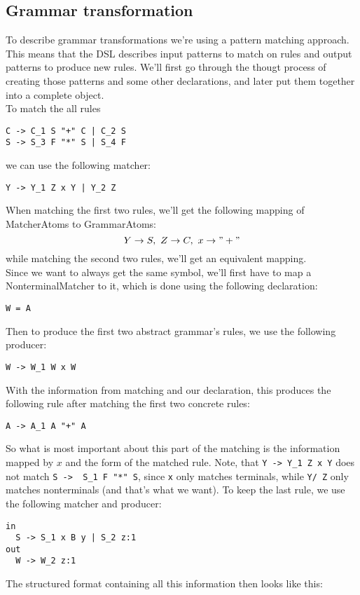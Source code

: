 \documentclass[a4paper]{article}
\begin{document}
\subsection*{Grammar transformation}
To describe grammar transformations we're using a pattern matching approach. This means that the DSL describes input patterns to match on rules and output patterns to produce new rules. We'll first go through the thougt process of creating those patterns and some other declarations, and later put them together into a complete object.\\
To match the all rules 
\begin{lstlisting}[language=grammar]
C -> C_1 S "+" C | C_2 S
S -> S_3 F "*" S | S_4 F
\end{lstlisting}
we can use the following matcher:
\lstset{language=transformer}
\begin{lstlisting}
Y -> Y_1 Z x Y | Y_2 Z
\end{lstlisting}
When matching the first two rules, we'll get the following mapping of MatcherAtoms to GrammarAtoms:
$$Y\to S, ~Z\to C, ~x\to "+"$$
while matching the second two rules, we'll get an equivalent mapping.\\
Since we want to always get the same symbol, we'll first have to map a NonterminalMatcher to it, which is done using the following declaration:
\begin{lstlisting}
W = A
\end{lstlisting}
Then to produce the first two abstract grammar's rules, we use the following producer:
\begin{lstlisting}
W -> W_1 W x W
\end{lstlisting}
With the information from matching and our declaration, this produces the following rule after matching the first two concrete rules:
\begin{lstlisting}[language=grammar]
A -> A_1 A "+" A
\end{lstlisting}
So what is most important about this part of the matching is the information mapped by $x$ and the form of the matched rule. Note, that \lstinline{Y -> Y_1 Z x Y} does not match \lstinline[language=grammar]{S ->  S_1 F "*" S}, since \lstinline{x} only matches terminals, while \lstinline{Y/ Z} only matches nonterminals (and that's what we want). To keep the last rule, we use the following matcher and producer:
\begin{lstlisting}
in
  S -> S_1 x B y | S_2 z:1
out
  W -> W_2 z:1
\end{lstlisting}
The structured format containing all this information then looks like this:
\end{document}
